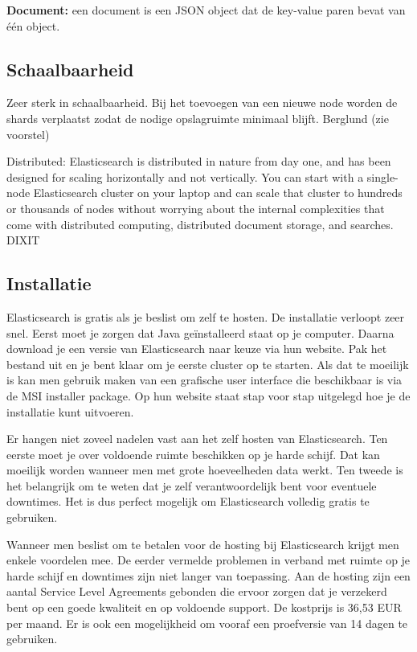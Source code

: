 \textbf{Document:} een document is een JSON object dat de key-value paren bevat van één object.

\subsection{Schaalbaarheid}


Zeer sterk in schaalbaarheid. Bij het toevoegen van een nieuwe node worden de shards verplaatst zodat de nodige opslagruimte minimaal blijft. Berglund (zie voorstel)  

Distributed: Elasticsearch is distributed in nature from day one, and has been designed for scaling horizontally and not vertically. You can start with a single-node Elasticsearch cluster on your laptop and can scale that cluster to hundreds or thousands of nodes without worrying about the internal complexities that come with distributed computing, distributed document storage, and searches. DIXIT

\subsection{Installatie}
\label{Installatie}

Elasticsearch is gratis als je beslist om zelf te hosten. De installatie verloopt zeer snel. Eerst moet je zorgen dat Java geïnstalleerd staat op je computer. Daarna download je een versie van Elasticsearch naar keuze via hun website. Pak het bestand uit en je bent klaar om je eerste cluster op te starten. Als dat te moeilijk is kan men gebruik maken van een grafische user interface die beschikbaar is via de MSI installer package. Op hun website staat stap voor stap uitgelegd hoe je de installatie kunt uitvoeren. 

Er hangen niet zoveel nadelen vast aan het zelf hosten van Elasticsearch. Ten eerste moet je over voldoende ruimte beschikken op je harde schijf. Dat kan moeilijk worden wanneer men met grote hoeveelheden data werkt. Ten tweede is het belangrijk om te weten dat je zelf verantwoordelijk bent voor eventuele downtimes. Het is dus perfect mogelijk om Elasticsearch volledig gratis te gebruiken. 

Wanneer men beslist om te betalen voor de hosting bij Elasticsearch krijgt men enkele voordelen mee. De eerder vermelde problemen in verband met ruimte op je harde schijf en downtimes zijn niet langer van toepassing.  Aan de hosting zijn een aantal Service Level Agreements gebonden die ervoor zorgen dat je verzekerd bent op een goede kwaliteit en op voldoende support. De kostprijs is 36,53 EUR per maand. Er is ook een mogelijkheid om vooraf een proefversie van 14 dagen te gebruiken.

